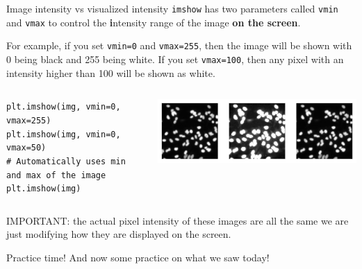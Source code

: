 \documentclass[9pt, aspectratio=169]{beamer}
\begin{document}
\begin{frame}
    {Image intensity vs visualized intensity}
    \texttt{imshow} has two parameters called \texttt{vmin} and \texttt{vmax} to control the \textbf intensity range of the image \textbf{on the screen}.

    For example, if you set \texttt{vmin=0} and \texttt{vmax=255}, then the image will be shown with 0 being black and 255 being white.
    If you set \texttt{vmax=100}, then any pixel with an intensity higher than 100 will be shown as white.
    \pause
    \begin{columns}
        \begin{column}{0.5\textwidth}
            \begin{codebox}
                \texttt{plt.imshow(img, vmin=0, vmax=255)\\
                    plt.imshow(img, vmin=0, vmax=50)\\
                    \# Automatically uses min and max of the image\\
                    plt.imshow(img)}
            \end{codebox}
        \end{column}
        \begin{column}{0.5\textwidth}
            \includegraphics[width=\textwidth]{vmin_vmax.png}
        \end{column}
    \end{columns}

    IMPORTANT: the actual pixel intensity of these images are all the same we are just modifying how they are displayed on the screen.
\end{frame}

\begin{frame}
    {Practice time!}
    \centering
    \Large
    And now some practice on what we saw today!
\end{frame}
\end{document}
